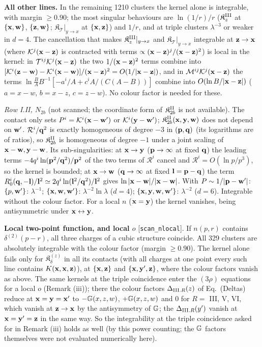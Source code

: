 \noindent\textbf{All other lines.} In the remaining 1210 clusters the kernel alone is integrable, with margin $\ge0.90$; the most singular behaviours are $\ln(1/r)/r$ ($\mathfrak K^{\rm III}_z$ at $\{\mathbf{x},\mathbf{w}\}$, $\{\mathbf{z},\mathbf{w}\}$; $\mathfrak K_{\mathcal T}|_{y\to x}$ at $\{\mathbf{x},\mathbf{z}\}$) and $1/r$, and at triple clusters $\lambda^{-3}$ or weaker in $d=4$. The cancellation that makes $\mathfrak K^{\rm III}_z|_{y\to x}$ and $\mathfrak K_{\mathcal T}|_{y\to x}$ integrable at $\mathbf{z}\to\mathbf{x}$ (where $\mathcal K^j(\mathbf{x}-\mathbf{z})$ is contracted with terms $\propto(\mathbf{x}-\mathbf{z})^j/(\mathbf{x}-\mathbf{z})^2$) is local in the kernel: in $\mathcal T^{ij}\mathcal K^j(\mathbf{x}-\mathbf{z})$ the two $1/(\mathbf{x}-\mathbf{z})^2$ terms combine into $[\mathcal K^i(\mathbf{z}-\mathbf{w})-\mathcal K^i(\mathbf{x}-\mathbf{w})]/(\mathbf{x}-\mathbf{z})^2=O(1/|\mathbf{x}-\mathbf{z}|)$, and in $\mathcal M^{ij}\mathcal K^j(\mathbf{x}-\mathbf{z})$ the terms $\ln\frac{B}{A}B^{-1}[-a^i/A+c^iA/(C(A-B))]$ combine into $O(\ln B/|\mathbf{x}-\mathbf{z}|)$ ($a=x-w$, $b=x-z$, $c=z-w$). No colour factor is needed for these.

\noindent\emph{Row I.II, $N_{2b}$} (not scanned; the coordinate form of $\mathfrak K^{\rm II}_{2b}$ is not available). The contact only sets $P^i=\mathcal K^i(\mathbf{x}-\mathbf{w}')$ or $\mathcal K^i(\mathbf{y}-\mathbf{w}')$; $\mathfrak K^{\rm II}_{2b}(\mathbf{x},\mathbf{y},\mathbf{w})$ does not depend on $\mathbf{w}'$. $\mathcal R^i/\mathbf{q}^2$ is exactly homogeneous of degree $-3$ in $(\mathbf{p},\mathbf{q})$ (its logarithms are of ratios), so $\mathfrak K^{\rm II}_{2b}$ is homogeneous of degree $-1$ under a joint scaling of $\mathbf{x}-\mathbf{w},\mathbf{y}-\mathbf{w}$. Its sub-singularities: at $\mathbf{x}\to\mathbf{y}$ ($\mathbf{p}\to\infty$ at fixed $\mathbf{q}$) the leading terms $-4q^i\ln(\mathbf{p}^2/\mathbf{q}^2)/\mathbf{p}^2$ of the two terms of $\mathcal R^i$ cancel and $\mathcal R^i=O(\ln p/p^3)$, so the kernel is bounded; at $\mathbf{x}\to\mathbf{w}$ ($\mathbf{q}\to\infty$ at fixed $\mathbf{l}=\mathbf{p}-\mathbf{q}$) the term $R_0^i(\mathbf{q},-\mathbf{l})/\mathbf{l}^2\simeq2q^i\ln(\mathbf{l}^2/\mathbf{q}^2)/\mathbf{l}^2$ gives $\ln|\mathbf{x}-\mathbf{w}|/|\mathbf{x}-\mathbf{w}|$. With $P\sim1/|\mathbf{p}-\mathbf{w}'|$: $\{p,\mathbf{w}'\}$: $\lambda^{-1}$; $\{\mathbf{x},\mathbf{w},\mathbf{w}'\}$: $\lambda^{-2}\ln\lambda$ ($d=4$); $\{\mathbf{x},\mathbf{y},\mathbf{w},\mathbf{w}'\}$: $\lambda^{-2}$ ($d=6$). Integrable without the colour factor. For a local $n$ ($\mathbf{x}=\mathbf{y}$) the kernel vanishes, being antisymmetric under $\mathbf{x}\leftrightarrow\mathbf{y}$.

\noindent\textbf{Local two-point function, and local $o$} [\texttt{scan\_nlocal}]. If $n(p,r)$ contains $\delta^{(2)}(p-r)$, all three charges of a cubic structure coincide. All 329 clusters are absolutely integrable with the colour factor (margin $\ge0.90$). The kernel alone fails only for $\mathfrak K^{(z)}_\delta$ in all its contacts (with all charges at one point every such line contains $K(\mathbf{x},\mathbf{x},\mathbf{z})$), at $\{\mathbf{x},\mathbf{z}\}$ and $\{\mathbf{x},\mathbf{y}',\mathbf{z}\}$, where the colour factors vanish as above. The same kernels at the triple coincidence enter the $(3\rho)$ equations for a local $o$ (Remark (iii)); there the colour factors $\Delta_{{\rm III}.R}(z)$ of Eq.~(Deltas) reduce at $\mathbf{x}=\mathbf{y}=\mathbf{x}'$ to $-\mathbb{G}(x,z,w)$, $+\mathbb{G}(x,z,w)$ and $0$ for $R=$ III, V, VI, which vanish at $\mathbf{z}\to\mathbf{x}$ by the antisymmetry of $\mathbb{G}$; the $\Delta_{{\rm III}.R}(y')$ vanish at $\mathbf{x}=\mathbf{y}'=\mathbf{z}$ in the same way. So the integrability at the triple coincidence asked for in Remark (iii) holds as well (by this power counting; the $\mathbb{G}$ factors themselves were not evaluated numerically here).

